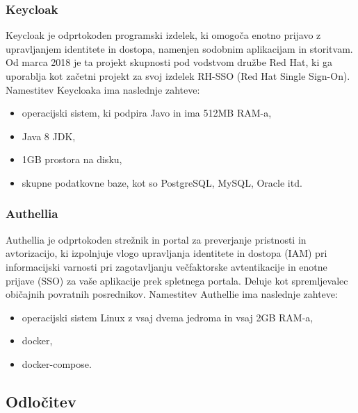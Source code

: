 \documentclass[a4paper,12pt,openright,oneside]{book}
\begin{document}
\subsubsection{Keycloak}
Keycloak \cite{Keycloak} je odprtokoden programski izdelek, ki omogoča enotno prijavo z upravljanjem identitete in dostopa, namenjen sodobnim aplikacijam in storitvam. Od marca 2018 je ta projekt skupnosti pod vodstvom družbe Red Hat, ki ga uporablja kot začetni projekt za svoj izdelek RH-SSO (Red Hat Single Sign-On).
\newline
Namestitev Keycloaka ima naslednje zahteve:
\begin{itemize}
    \item operacijski sistem, ki podpira Javo in ima 512MB RAM-a,
    \item Java 8 JDK,
    \item 1GB prostora na disku,
    \item skupne podatkovne baze, kot so PostgreSQL, MySQL, Oracle itd. 
\end{itemize}
\subsubsection{Authellia}
Authellia \cite{Authellia} je odprtokoden strežnik in portal za preverjanje pristnosti in avtorizacijo, ki izpolnjuje vlogo upravljanja identitete in dostopa (IAM) pri informacijski varnosti pri zagotavljanju večfaktorske avtentikacije in enotne prijave (SSO) za vaše aplikacije prek spletnega portala. Deluje kot spremljevalec običajnih povratnih posrednikov.
\newline
Namestitev Authellie ima naslednje zahteve:
\begin{itemize}
    \item operacijski sistem Linux z vsaj dvema jedroma in vsaj 2GB RAM-a,
    \item docker,
    \item docker-compose.
\end{itemize}


\subsection{Odločitev}
\end{document}
